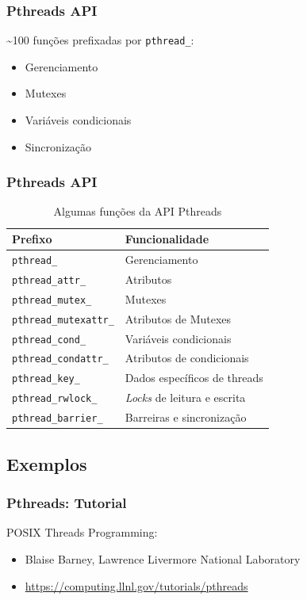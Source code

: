\documentclass[10pt, compress]{beamer}
\begin{document}
\begin{frame}
    \frametitle{Pthreads API}
    \alert{\textasciitilde{}100 funções} prefixadas por \texttt{pthread\_}:
    \begin{itemize}
        \item Gerenciamento
        \item Mutexes
        \item Variáveis condicionais
        \item Sincronização
    \end{itemize}
\end{frame}

\begin{frame}
    \frametitle{Pthreads API}
    \begin{table}[]
        \centering
        \begin{tabular}{@{}ll@{}}
            \toprule
            \textbf{Prefixo} & \textbf{Funcionalidade} \\ \midrule
            \texttt{pthread\_} &  Gerenciamento \\
            \texttt{pthread\_attr\_} & Atributos \\
            \texttt{pthread\_mutex\_} &  Mutexes \\
            \texttt{pthread\_mutexattr\_} & Atributos de Mutexes \\
            \texttt{pthread\_cond\_} & Variáveis condicionais \\
            \texttt{pthread\_condattr\_} & Atributos de condicionais \\
            \texttt{pthread\_key\_} & Dados específicos de threads \\
            \texttt{pthread\_rwlock\_} & \textit{Locks} de leitura e escrita \\
            \texttt{pthread\_barrier\_} &  Barreiras e sincronização \\ \bottomrule
        \end{tabular}
        \label{my-label}
        \caption{Algumas funções da API Pthreads}
    \end{table}
\end{frame}

\subsection{Exemplos}

\begin{frame}
    \frametitle{Pthreads: Tutorial}
    \alert{POSIX Threads Programming}:
    \begin{itemize}
        \item Blaise Barney, Lawrence Livermore National Laboratory
        \item \url{https://computing.llnl.gov/tutorials/pthreads}
    \end{itemize}
\end{frame}
\end{document}
